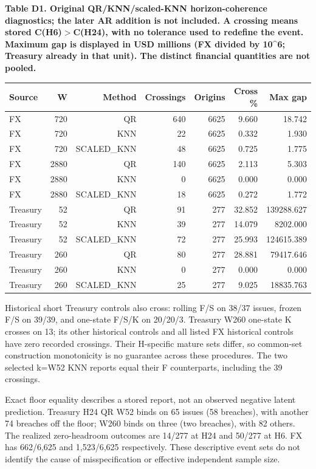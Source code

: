 \documentclass[10pt,a4paper]{article}
\begin{document}
\begin{center}
\begin{minipage}{\linewidth}
\small\textbf{Table D1. Original QR/KNN/scaled-KNN horizon-coherence diagnostics; the later AR addition is not included. A crossing means stored C(H6)\( > \)C(H24), with no tolerance used to redefine the event. Maximum gap is displayed in USD millions (FX divided by 10\textasciicircum{}6; Treasury already in that unit). The distinct financial quantities are not pooled.}\par\medskip
\centering\fontsize{8}{10}\selectfont
\begin{tabular}{lrrrrrr}
\toprule
Source & W & Method & Crossings & Origins & Cross \% & Max gap \\
\midrule
FX & 720 & QR & 640 & 6625 & 9.660 & 18.742 \\
FX & 720 & KNN & 22 & 6625 & 0.332 & 1.930 \\
FX & 720 & SCALED\_KNN & 48 & 6625 & 0.725 & 1.775 \\
FX & 2880 & QR & 140 & 6625 & 2.113 & 5.303 \\
FX & 2880 & KNN & 0 & 6625 & 0.000 & 0.000 \\
FX & 2880 & SCALED\_KNN & 18 & 6625 & 0.272 & 1.772 \\
Treasury & 52 & QR & 91 & 277 & 32.852 & 139288.627 \\
Treasury & 52 & KNN & 39 & 277 & 14.079 & 8202.000 \\
Treasury & 52 & SCALED\_KNN & 72 & 277 & 25.993 & 124615.389 \\
Treasury & 260 & QR & 80 & 277 & 28.881 & 79417.646 \\
Treasury & 260 & KNN & 0 & 277 & 0.000 & 0.000 \\
Treasury & 260 & SCALED\_KNN & 25 & 277 & 9.025 & 18835.763 \\
\bottomrule
\end{tabular}
\end{minipage}
\end{center}
Historical short Treasury controls also cross: rolling F/S on 38/37 issues, frozen F/S on 39/39, and one-state F/S/K on 20/20/3. Treasury W260 one-state K crosses on 13; its other historical controls and all listed FX historical controls have zero recorded crossings. Their H-specific mature sets differ, so common-set construction monotonicity is no guarantee across these procedures. The two selected k=W52 KNN reports equal their F counterparts, including the 39 crossings.

Exact floor equality describes a stored report, not an observed negative latent prediction. Treasury H24 QR W52 binds on 65 issues (58 breaches), with another 74 breaches off the floor; W260 binds on three (two breaches), with 82 others. The realized zero-headroom outcomes are 14/277 at H24 and 50/277 at H6. FX has 662/6,625 and 1,523/6,625 respectively. These descriptive event sets do not identify the cause of misspecification or effective independent sample size.
\end{document}
